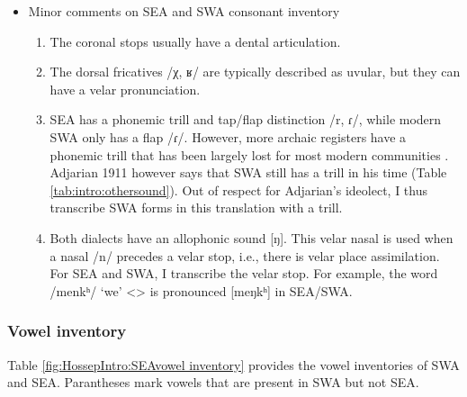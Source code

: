 \begin{itemize}
	\item Minor comments on SEA and SWA consonant inventory 
	\begin{enumerate}
		\item The coronal stops usually have a dental articulation. 
		\item The dorsal fricatives /χ, ʁ/ are typically described as uvular, but they can have a velar pronunciation. 
		\item SEA has a phonemic trill and tap/flap distinction /r, ɾ/, while modern SWA only has a flap /ɾ/. However, more archaic registers have a phonemic trill that has been largely lost for most modern communities \citep{Tahtadjian-2020-WesterArmenianRhoticDifferentialPhoneticStudy}. Adjarian 1911 however says that SWA still has a trill in his time (Table \ref{tab:intro:othersound}).  Out of respect for Adjarian's ideolect, I thus transcribe SWA forms in this translation with a trill. 
		\item Both dialects   have an allophonic sound [ŋ]. This velar nasal is used when a nasal /n/ precedes a velar stop, i.e., there is velar place assimilation. For SEA and SWA, I transcribe the velar stop. For example, the word /menkʰ/ `we' <> is pronounced [meŋkʰ] in SEA/SWA.  
		
	\end{enumerate}
\end{itemize}

\subsubsection{Vowel inventory}\label{sec:HossepIntro:phonotransc:modern:vowe}
Table \ref{fig:HossepIntro:SEAvowel inventory} provides the vowel inventories of SWA and SEA. Parantheses mark vowels that are present in SWA but not SEA. 

